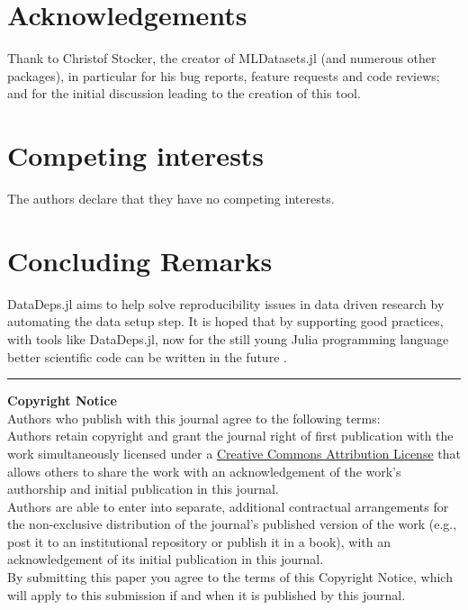 \documentclass[dvinames]{jors}
\begin{document}
\section*{Acknowledgements}
Thank to Christof Stocker, the creator of MLDatasets.jl (and numerous other packages), in particular for his bug reports, feature requests and code reviews; and for the initial discussion leading to the creation of this tool.

\section*{Competing interests}
The authors declare that they have no competing interests.

\section {Concluding Remarks} 
DataDeps.jl aims to help solve reproducibility issues in data driven research by automating the data setup step. 
It is hoped that by supporting good practices, with tools like DataDeps.jl, now for the still young Julia programming language 
better scientific code can be written in the future . 

\newpage
\printbibliography


\vspace{2cm}

\rule{\textwidth}{1pt}

{ \bf Copyright Notice} \\
Authors who publish with this journal agree to the following terms: \\

Authors retain copyright and grant the journal right of first publication with the work simultaneously licensed under a  \href{http://creativecommons.org/licenses/by/3.0/}{Creative Commons Attribution License} that allows others to share the work with an acknowledgement of the work's authorship and initial publication in this journal. \\

Authors are able to enter into separate, additional contractual arrangements for the non-exclusive distribution of the journal's published version of the work (e.g., post it to an institutional repository or publish it in a book), with an acknowledgement of its initial publication in this journal. \\

By submitting this paper you agree to the terms of this Copyright Notice, which will apply to this submission if and when it is published by this journal.
\end{document}
